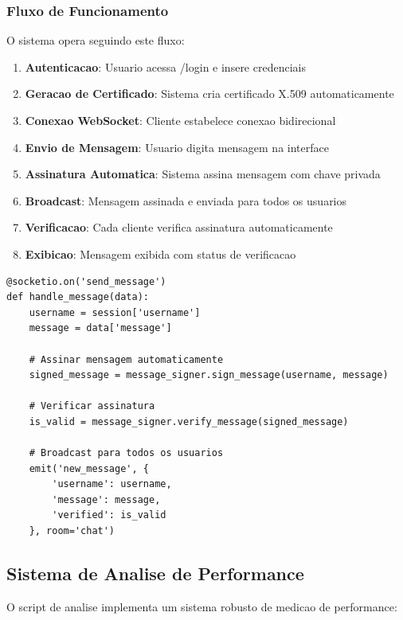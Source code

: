\documentclass[12pt,a4paper,oneside]{article}
\begin{document}
\subsubsection{Fluxo de Funcionamento}

O sistema opera seguindo este fluxo:

\begin{enumerate}
    \item \textbf{Autenticacao}: Usuario acessa /login e insere credenciais
    \item \textbf{Geracao de Certificado}: Sistema cria certificado X.509 automaticamente
    \item \textbf{Conexao WebSocket}: Cliente estabelece conexao bidirecional
    \item \textbf{Envio de Mensagem}: Usuario digita mensagem na interface
    \item \textbf{Assinatura Automatica}: Sistema assina mensagem com chave privada
    \item \textbf{Broadcast}: Mensagem assinada e enviada para todos os usuarios
    \item \textbf{Verificacao}: Cada cliente verifica assinatura automaticamente
    \item \textbf{Exibicao}: Mensagem exibida com status de verificacao
\end{enumerate}

\begin{lstlisting}[caption=Processamento de mensagem no chat]
@socketio.on('send_message')
def handle_message(data):
    username = session['username']
    message = data['message']
    
    # Assinar mensagem automaticamente
    signed_message = message_signer.sign_message(username, message)
    
    # Verificar assinatura
    is_valid = message_signer.verify_message(signed_message)
    
    # Broadcast para todos os usuarios
    emit('new_message', {
        'username': username,
        'message': message,
        'verified': is_valid
    }, room='chat')
\end{lstlisting}

\subsection{Sistema de Analise de Performance}

O script de analise implementa um sistema robusto de medicao de performance:
\end{document}
